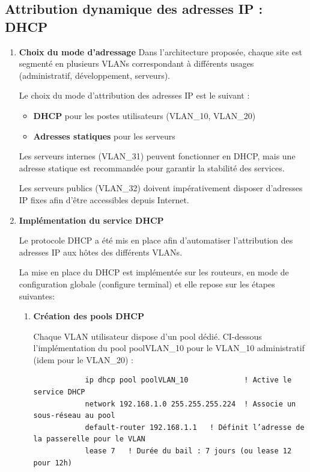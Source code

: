 \documentclass[12pt,a4paper, oneside]{memoir}
\begin{document}
	\subsection{Attribution dynamique des adresses IP : DHCP}
	
		\begin{enumerate}
			\item \textbf{Choix du mode d’adressage}
		Dans l’architecture proposée, chaque site est segmenté en plusieurs VLANs correspondant à différents usages (administratif, développement, serveurs).
		
		Le choix du mode d’attribution des adresses IP est le suivant :
		
			\begin{itemize}
				\item \textbf{DHCP} pour les postes utilisateurs (VLAN\_10, VLAN\_20)
				\item \textbf{Adresses statiques} pour les serveurs
			\end{itemize}
		
		Les serveurs internes (VLAN\_31) peuvent fonctionner en DHCP, mais une adresse statique est recommandée pour garantir la stabilité des services.  
		
		Les serveurs publics (VLAN\_32) doivent impérativement disposer d’adresses IP fixes afin d’être accessibles depuis Internet.
	
		\item \textbf{Implémentation du service DHCP}
	
	Le protocole DHCP a été mis en place afin d’automatiser l’attribution des adresses IP aux hôtes des différents VLANs.
	
	La mise en place du DHCP est implémentée sur les routeurs, en mode de configuration globale (configure terminal) et elle repose sur les étapes suivantes: 
	
		\begin{enumerate}
			\item  \textbf{Création des pools DHCP}
			
		Chaque VLAN utilisateur dispose d'un pool dédié. CI-dessous l'implémentation du pool poolVLAN\_10 pour le VLAN\_10 administratif (idem pour le VLAN\_20) : 
		\begin{verbatim}
			ip dhcp pool poolVLAN_10             ! Active le service DHCP
			network 192.168.1.0 255.255.255.224  ! Associe un sous-réseau au pool
			default-router 192.168.1.1   ! Définit l’adresse de la passerelle pour le VLAN
			lease 7   ! Durée du bail : 7 jours (ou lease 12 pour 12h)
		\end{verbatim}


\end{enumerate}
\end{enumerate}
\end{document}
